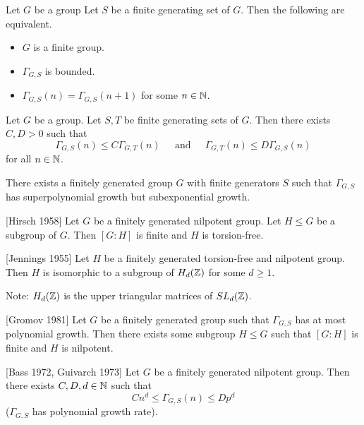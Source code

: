 \documentclass[a4paper]{article}
\begin{document}
\begin{prp}{}{} Let $G$ be a group Let $S$ be a finite generating set of $G$. Then the following are equivalent. 
\begin{itemize}
\item $G$ is a finite group. 
\item $\Gamma_{G,S}$ is bounded. 
\item $\Gamma_{G,S}(n)=\Gamma_{G,S}(n+1)$ for some $n\in\mathbb{N}$. 
\end{itemize}
\end{prp}

\begin{lmm}{}{} Let $G$ be a group. Let $S,T$ be finite generating sets of $G$. Then there exists $C,D>0$ such that $$\Gamma_{G,S}(n)\leq C\Gamma_{G,T}(n)\;\;\;\;\text{ and }\;\;\;\;\Gamma_{G,T}(n)\leq D\Gamma_{G,S}(n)$$ for all $n\in\mathbb{N}$. 
\end{lmm}

\begin{thm}{}{} There exists a finitely generated group $G$ with finite generators $S$ such that $\Gamma_{G,S}$ has superpolynomial growth but subexponential growth. 
\end{thm}

\begin{thm}{[Hirsch 1958]}{} Let $G$ be a finitely generated nilpotent group. Let $H\leq G$ be a subgroup of $G$. Then $[G:H]$ is finite and $H$ is torsion-free. 
\end{thm}

\begin{thm}{[Jennings 1955]}{} Let $H$ be a finitely generated torsion-free and nilpotent group. Then $H$ is isomorphic to a subgroup of $H_d(\mathbb{Z})$ for some $d\geq 1$. 
\end{thm}

Note: $H_d(\mathbb{Z})$ is the upper triangular matrices of $SL_d(\mathbb{Z})$. 

\begin{thm}{[Gromov 1981]}{} Let $G$ be a finitely generated group such that $\Gamma_{G,S}$ has at most polynomial growth. Then there exists some subgroup $H\leq G$ such that $[G:H]$ is finite and $H$ is nilpotent. 
\end{thm}

\begin{thm}{[Bass 1972, Guivarch 1973]}{} Let $G$ be a finitely generated nilpotent group. Then there exists $C,D,d\in\mathbb{N}$ such that $$Cn^d\leq\Gamma_{G,S}(n)\leq Dp^d$$ ($\Gamma_{G,S}$ has polynomial growth rate). 
\end{thm}
\end{document}
